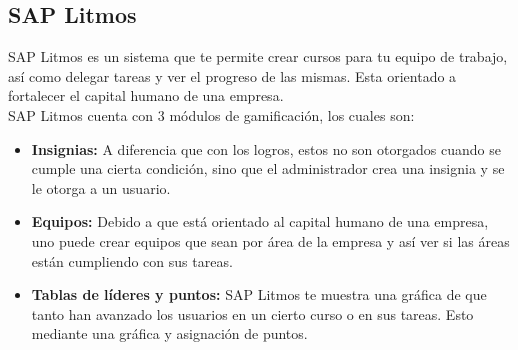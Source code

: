 \begin{multicols}{2}
\begin{comment}
    \subsubsection{Ventajas y desventajas}
    \begin{multicols}{2}
        \textbf{Ventajas}\\
        \begin{Titemize}
            \Titem{ Te permite tener tu dominio en internet para no meterte en problemas de servidores.}
            \Titem{ Puedes extender la funcionalidad inicial con componentes externos.}
        \end{Titemize}
        \columnbreak 
        \textbf{Desventajas}\\ 
        \begin{Titemize}
            \Titem{ Solo acepta cuentas con correos de empresas o instituciones registradas.}
            \Titem{ . }
        \end{Titemize}
    \end{multicols}
\end{comment}    
    
    

\subsection*{SAP Litmos}
    
    SAP Litmos es un sistema que te permite crear cursos para tu equipo de trabajo, así como delegar tareas y ver el progreso de las mismas. Esta orientado a fortalecer el capital humano de una empresa.\\
    
    \noindent SAP Litmos cuenta con 3 módulos de gamificación, los cuales son:
    \begin{itemize}
        \item \textbf{Insignias: } A diferencia que con los logros, estos no son otorgados cuando se cumple una cierta condición, sino que el administrador crea una insignia y se le otorga a un usuario.
        \item \textbf{Equipos: } Debido a que está orientado al capital humano de una empresa, uno puede crear equipos que sean por área de la empresa y así ver si las áreas están cumpliendo con sus tareas.
        \item \textbf{Tablas de líderes y puntos: } SAP Litmos te muestra una gráfica de que tanto han avanzado los usuarios en un cierto curso o en sus tareas. Esto mediante una gráfica y asignación de puntos.
    \end{itemize}


\end{multicols}
